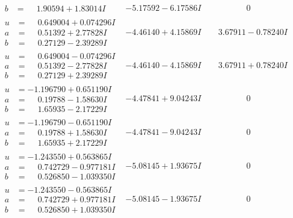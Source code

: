 \documentclass[1p]{elsarticle_modified}
\theoremstyle{definition}
\begin{document}
$$\begin{array}{c|c|c}
\begin{aligned}
b &= \phantom{-}1.90594 + 1.83014 I\end{aligned}
 & -5.17592 - 6.17586 I & \phantom{-0.000000 } 0 \\ \hline\begin{aligned}
u &= \phantom{-}0.649004 + 0.074296 I \\
a &= \phantom{-}0.51392 + 2.77828 I \\
b &= \phantom{-}0.27129 - 2.39289 I\end{aligned}
 & -4.46140 + 4.15869 I & \phantom{-}3.67911 - 0.78240 I \\ \hline\begin{aligned}
u &= \phantom{-}0.649004 - 0.074296 I \\
a &= \phantom{-}0.51392 - 2.77828 I \\
b &= \phantom{-}0.27129 + 2.39289 I\end{aligned}
 & -4.46140 - 4.15869 I & \phantom{-}3.67911 + 0.78240 I \\ \hline\begin{aligned}
u &= -1.196790 + 0.651190 I \\
a &= \phantom{-}0.19788 - 1.58630 I \\
b &= \phantom{-}1.65935 - 2.17229 I\end{aligned}
 & -4.47841 + 9.04243 I & \phantom{-0.000000 } 0 \\ \hline\begin{aligned}
u &= -1.196790 - 0.651190 I \\
a &= \phantom{-}0.19788 + 1.58630 I \\
b &= \phantom{-}1.65935 + 2.17229 I\end{aligned}
 & -4.47841 - 9.04243 I & \phantom{-0.000000 } 0 \\ \hline\begin{aligned}
u &= -1.243550 + 0.563865 I \\
a &= \phantom{-}0.742729 - 0.977181 I \\
b &= \phantom{-}0.526850 - 1.039350 I\end{aligned}
 & -5.08145 + 1.93675 I & \phantom{-0.000000 } 0 \\ \hline\begin{aligned}
u &= -1.243550 - 0.563865 I \\
a &= \phantom{-}0.742729 + 0.977181 I \\
b &= \phantom{-}0.526850 + 1.039350 I\end{aligned}
 & -5.08145 - 1.93675 I & \phantom{-0.000000 } 0 \\ \hline\begin{aligned}

\end{aligned}
\end{array}$$
\end{document}
